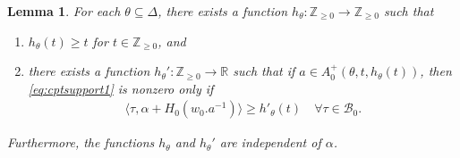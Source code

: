 \documentclass[10pt]{amsart}
\newtheorem{lemma}[theorem]{Lemma}
\theoremstyle{definition}
\numberwithin{equation}{section}
\numberwithin{equation}{subsection}
\newcommand{\ZZ}{\mathbb{Z}}
\newcommand{\calB}{\mathcal{B}}
\begin{document}

\begin{lemma}\label{lemma:support} For each $\theta\subseteq\Delta$, there exists a function $h_\theta:\mathbb{Z}_{\geq 0}\to \ZZ_{\ge 0}$ such that
\begin{enumerate}
    \item $h_\theta(t)\geq t$ for $t\in\mathbb{Z}_{\geq 0}$, and 
    \item there exists a function $h_\theta':\mathbb{Z}_{\geq 0}\to\mathbb{R}$ such that if $a\in A_0^+(\theta,t,h_\theta(t))$, then \eqref{eq:cptsupport1} is nonzero only if 
\begin{align*}
    \langle \tau,\alpha+ H_0(w_0.a^{-1})\rangle\ge h'_{\theta}(t)\quad  \forall \tau\in \calB_0.
\end{align*}
\end{enumerate}
Furthermore, the functions $h_\theta$ and $h_\theta'$ are independent of $\alpha$.
\end{lemma}
\end{document}
